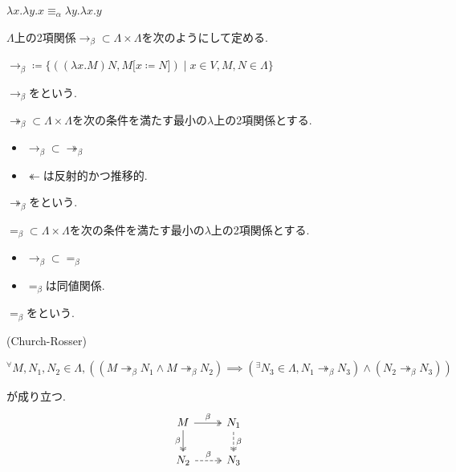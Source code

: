 \begin{example}
$\lambda x.\lambda y.x \equiv_\alpha \lambda y.\lambda x.y$
\end{example}

\begin{definition}
$\Lambda$上の2項関係$\to_\beta \subset \Lambda \times \Lambda$を次のようにして定める.
\begin{center}
    $\to_\beta \coloneq \{((\lambda x.M)N, M \lbrack x \coloneq N \rbrack) \mid x \in V, M, N \in \Lambda\}$
\end{center}
$\to_\beta$をという.
\end{definition}

\begin{definition}
$\twoheadrightarrow_\beta \subset \Lambda \times \Lambda$を次の条件を満たす最小の$\lambda$上の2項関係とする.
\begin{itemize}
    \item $\to_\beta \subset \twoheadrightarrow_\beta$
    \item $\twoheadleftarrow$は反射的かつ推移的.
\end{itemize}

$\twoheadrightarrow_\beta$をという.
\end{definition}

\begin{definition}
$=_\beta \subset \Lambda \times \Lambda$を次の条件を満たす最小の$\lambda$上の2項関係とする.
\begin{itemize}
    \item $\to_\beta \subset =_\beta$
    \item $=_\beta$は同値関係.
\end{itemize}
$=_\beta$をという.
\end{definition}

\begin{theorem} (Church-Rosser)
\begin{center}
${^{\forall}}M, N_1, N_2 \in \Lambda, ((M \twoheadrightarrow_\beta N_1 \land M \twoheadrightarrow_\beta N_2) \implies ({^{\exists}}N_3 \in \Lambda, N_1 \twoheadrightarrow_\beta N_3) \land (N_2 \twoheadrightarrow_\beta N_3))$
\end{center}
が成り立つ.
\[\begin{tikzcd}
	M & {N_1} \\
	{N_2} & {N_3}
	\arrow["\beta", two heads, from=1-1, to=1-2]
	\arrow["\beta"', two heads, from=1-1, to=2-1]
	\arrow["\beta", dashed, two heads, from=1-2, to=2-2]
	\arrow["\beta", dashed, two heads, from=2-1, to=2-2]
\end{tikzcd}\]
\end{theorem}